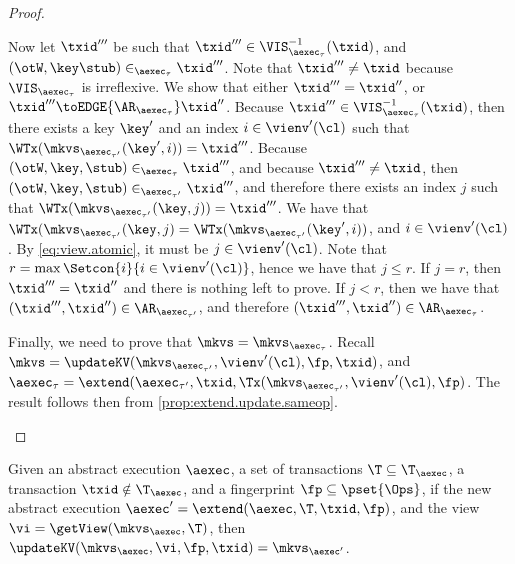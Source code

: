 \begin{proof}
\begin{itemize}
\begin{itemize}
Now let $\txid'''$ be such that $\txid''' \in \VIS^{-1}_{\aexec_{\tau}}(\txid)$, and $(\otW, \key \stub) \in_{\aexec_{\tau}} \txid'''$. 
Note that $\txid''' \neq \txid$ because $\VIS_{\aexec_{\tau}}$ is irreflexive.
We show that either $\txid''' = \txid''$, or $\txid''' \toEDGE{\AR_{\aexec_{\tau}}} \txid''$. 
Because $\txid''' \in \VIS^{-1}_{\aexec_{\tau}}(\txid)$, then there exists a key $\key'$ and an index $i \in \vienv'(\cl)$ 
such that $\WTx(\mkvs_{\aexec_{\tau'}}(\key', i)) = \txid'''$. Because $(\otW, \key, \stub) \in_{\aexec_{\tau}} \txid'''$, 
and because $\txid''' \neq \txid$, then $(\otW, \key, \stub) \in_{\aexec_{\tau'}} \txid'''$, and therefore there exists 
an index $j$ such that $\WTx(\mkvs_{\aexec_{\tau'}}(\key, j)) = \txid'''$. We have that $\WTx(\mkvs_{\aexec_{\tau'}}(\key, j) = 
\WTx(\mkvs_{\aexec_{\tau'}}(\key', i))$, and $i \in \vienv'(\cl)$. By \cref{eq:view.atomic}, it must be $j \in \vienv'(\cl)$. 
Note that $r = \max\Setcon{i }{ i \in \vienv'(\cl)}$, hence we have that $j \leq r$. If $j = r$, then $\txid''' = \txid''$ and 
there is nothing left to prove. If $j < r$, then we have that $(\txid''', \txid'') \in \AR_{\aexec_{\tau'}}$, and 
therefore $(\txid''', \txid'') \in \AR_{\aexec_{\tau}}$.
\end{itemize}
Finally, we need to prove that $\mkvs = \mkvs_{\aexec_{\tau}}$.
Recall $\mkvs = \updateKV(\mkvs_{\aexec_{\tau'}}, \vienv'(\cl), \fp, \txid)$, 
and $\aexec_{\tau} = \extend(\aexec_{\tau'}, \txid, \Tx(\mkvs_{\aexec_{\tau'}}, \vienv'(\cl), \fp)$. 
The result follows then from \cref{prop:extend.update.sameop}. 
\end{itemize}
\end{proof}


\begin{proposition}
\label{prop:extend.update.sameop}
Given an abstract execution $\aexec$, a set of transactions $\T \subseteq \T_{\aexec}$,
a transaction $\txid \notin \T_{\aexec}$, and a fingerprint $\fp \subseteq \pset{\Ops}$,
if the new abstract execution $\aexec' = \extend(\aexec, \T, \txid, \fp)$,
and the view $\vi = \getView(\mkvs_{\aexec}, \T)$,
then $\updateKV(\mkvs_{\aexec}, \vi, \fp, \txid) = \mkvs_{\aexec'}$.
\end{proposition}


